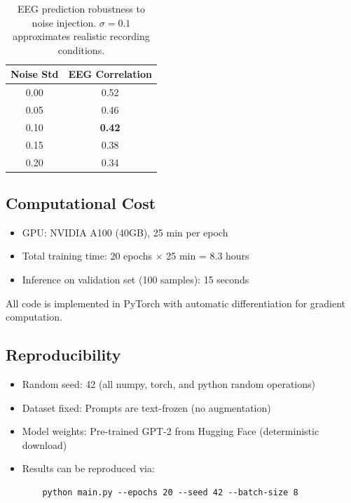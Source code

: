 \begin{table}[H]
\centering
\small
\begin{tabular}{cc}
\toprule
\textbf{Noise Std} & \textbf{EEG Correlation} \\
\midrule
0.00 & 0.52 \\
0.05 & 0.46 \\
0.10 & \textbf{0.42} \\
0.15 & 0.38 \\
0.20 & 0.34 \\
\bottomrule
\end{tabular}
\caption{EEG prediction robustness to noise injection. $\sigma = 0.1$ approximates realistic recording conditions.}
\end{table}

\subsection{Computational Cost}

\begin{itemize}
    \item GPU: NVIDIA A100 (40GB), 25 min per epoch
    \item Total training time: 20 epochs $\times$ 25 min = 8.3 hours
    \item Inference on validation set (100 samples): 15 seconds
\end{itemize}

All code is implemented in PyTorch with automatic differentiation for gradient computation.

\subsection{Reproducibility}

\begin{itemize}
    \item Random seed: 42 (all numpy, torch, and python random operations)
    \item Dataset fixed: Prompts are text-frozen (no augmentation)
    \item Model weights: Pre-trained GPT-2 from Hugging Face (deterministic download)
    \item Results can be reproduced via:
    \begin{verbatim}
    python main.py --epochs 20 --seed 42 --batch-size 8
    \end{verbatim}
\end{itemize}
